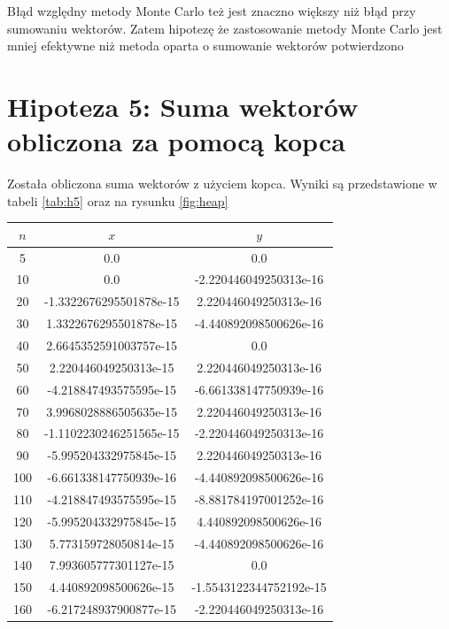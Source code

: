 \documentclass[12pt,a4paper]{article}
\begin{document}
Błąd względny metody Monte Carlo też jest znaczno większy niż błąd przy sumowaniu wektorów. Zatem hipotezę że zastosowanie metody Monte Carlo jest mniej efektywne niż metoda oparta o sumowanie wektorów potwierdzono

\newpage

\section{Hipoteza 5: Suma wektorów obliczona za pomocą kopca}

Została obliczona suma wektorów z użyciem kopca. Wyniki są przedstawione w tabeli \ref{tab:h5} oraz na rysunku \ref{fig:heap}


\begin{table}[htbp]
    \centering
    \begin{tabular}{ | c | c | c | }
      \hline
        {$n$} & {$x$} & {$y$} \\
        \hline
        5 & 0.0 & 0.0 \\
        10 & 0.0 & -2.220446049250313e-16 \\
        20 & -1.3322676295501878e-15 & 2.220446049250313e-16 \\
        30 & 1.3322676295501878e-15 & -4.440892098500626e-16 \\
        40 & 2.6645352591003757e-15 & 0.0 \\
        50 & 2.220446049250313e-15 & 2.220446049250313e-16 \\
        60 & -4.218847493575595e-15 & -6.661338147750939e-16 \\
        70 & 3.9968028886505635e-15 & 2.220446049250313e-16 \\
        80 & -1.1102230246251565e-15 & -2.220446049250313e-16 \\
        90 & -5.995204332975845e-15 & 2.220446049250313e-16 \\
        100 & -6.661338147750939e-16 & -4.440892098500626e-16 \\
        110 & -4.218847493575595e-15 & -8.881784197001252e-16 \\
        120 & -5.995204332975845e-15 & 4.440892098500626e-16 \\
        130 & 5.773159728050814e-15 & -4.440892098500626e-16 \\
        140 & 7.993605777301127e-15 & 0.0 \\
        150 & 4.440892098500626e-15 & -1.5543122344752192e-15 \\
        160 & -6.217248937900877e-15 & -2.220446049250313e-16 \\

\end{tabular}
\end{table}
\end{document}

